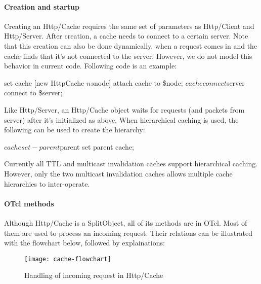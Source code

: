 \paragraph{Creation and startup}

Creating an Http/Cache requires the same set of parameters as
Http/Client and Http/Server. After creation, a cache needs to connect 
to a certain server. Note that this creation can also be done dynamically,
when a request comes in and the cache finds that it's not connected to 
the server. However, we do not model this behavior in current code.
Following code is an example:

\begin{program}
        set cache [new HttpCache $ns $node] \; attach cache to \$node;
        $cache connect $server \; connect to \$server;
\end{program}

Like Http/Server, an Http/Cache object waits for requests (and packets
from server) after it's initialized as above. When hierarchical
caching is used, the following can be used to create the hierarchy:

\begin{program}
        $cache set-parent $parent \; set parent cache;
\end{program}

Currently all TTL and multicast invalidation caches support hierarchical
caching. However, only the two multicast invalidation caches allows 
multiple cache hierarchies to inter-operate.

\paragraph{OTcl methods}

Although Http/Cache is a SplitObject, all of its methods are in OTcl. 
Most of them are used to process an incoming request. Their relations can
be illustrated with the flowchart below, followed by explainations:

\begin{figure}[h]
  \begin{center}
    \texttt{[image: cache-flowchart]}
    \caption{Handling of incoming request in Http/Cache}
    \label{fig:webcache-handle-request}
  \end{center}
\end{figure}

